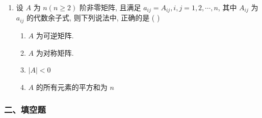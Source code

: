 \documentclass[12pt, a4paper]{ctexart}
\begin{document}
\begin{enumerate}
    ① 当 $ r\left(\left(A^*\right)^*\right) = r\left(A^*\right) $ 时， $ r\left(A, A^*\right) \neq n - 1 $．
    
    ② 当 $ r\left(\left(A^*\right)^*\right) = r\left(A^*\right) $ 时， $ r\left(A - A^*\right) \neq n - 1 $．
    
    ③ 当 $ r\left(\left(A^*\right)^*\right) < r\left(A^*\right) $ 时， $ r\left(A, A^*\right) = n $．
    
    ④ 当 $ r\left(\left(A^*\right)^*\right) < r\left(A^*\right) $ 时， $ r\left(A - A^*\right) = n $．
    \begin{enumerate}[label=(\Alph*)]
        \item 0
        \item 1
        \item 2
        \item 3
    \end{enumerate}

    \item 设 $ A $ 为 $ n(n \geq 2) $ 阶非零矩阵, 且满足 $ a_{ij} = A_{ij}, i, j = 1, 2, \cdots, n $, 其中 $ A_{ij} $ 为 $ a_{ij} $ 的代数余子式, 则下列说法中, 正确的是 ( \underline{\hspace{1cm}} )
    \begin{enumerate}[label=(\Alph*)]
        \item $ A $ 为可逆矩阵.
        \item $ A $ 为对称矩阵.
        \item $ |A| < 0 $
        \item $ A $ 的所有元素的平方和为 $ n $
    \end{enumerate}
\end{enumerate}

\subsubsection*{二、填空题}
\end{document}
